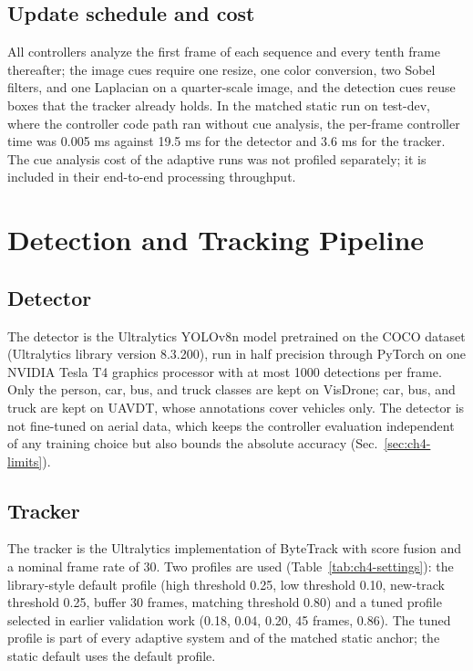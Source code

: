 \subsection{Update schedule and cost}
All controllers analyze the first frame of each sequence and every tenth frame thereafter; the image cues require one resize, one color conversion, two Sobel filters, and one Laplacian on a quarter-scale image, and the detection cues reuse boxes that the tracker already holds. In the matched static run on test-dev, where the controller code path ran without cue analysis, the per-frame controller time was 0.005 ms against 19.5 ms for the detector and 3.6 ms for the tracker. The cue analysis cost of the adaptive runs was not profiled separately; it is included in their end-to-end processing throughput.

\section{Detection and Tracking Pipeline}\label{sec:ch4-pipeline}

\subsection{Detector}
The detector is the Ultralytics YOLOv8n model pretrained on the COCO dataset (Ultralytics library version 8.3.200), run in half precision through PyTorch on one NVIDIA Tesla T4 graphics processor with at most 1000 detections per frame. Only the person, car, bus, and truck classes are kept on VisDrone; car, bus, and truck are kept on UAVDT, whose annotations cover vehicles only. The detector is not fine-tuned on aerial data, which keeps the controller evaluation independent of any training choice but also bounds the absolute accuracy (Sec.~\ref{sec:ch4-limits}).

\subsection{Tracker}
The tracker is the Ultralytics implementation of ByteTrack \cite{zhang2022bytetrack} with score fusion and a nominal frame rate of 30. Two profiles are used (Table~\ref{tab:ch4-settings}): the library-style default profile (high threshold 0.25, low threshold 0.10, new-track threshold 0.25, buffer 30 frames, matching threshold 0.80) and a tuned profile selected in earlier validation work (0.18, 0.04, 0.20, 45 frames, 0.86). The tuned profile is part of every adaptive system and of the matched static anchor; the static default uses the default profile.

